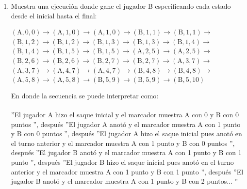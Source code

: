 \begin{exercise}
\begin{enumerate}
\[{\begin{array}{lcl}
                        \inference{(\text{B},\text{X},\text{Y})\ \text{ I} \cup \Gamma ,& (\text{B},\text{X},\text{Y}+1)\ \text{ } \Gamma \cup \text{F}}{(\text{B},\text{X},\text{Y})\rightarrow(\text{B},\text{X},\text{Y}+1)\  \text{ } \Gamma \cup \text{F}}[$(\text{B}+)$] 
                    \end{array}
                }
                \] 
                \bigskip
                \[
                \scalemath{0.81}{
                    \begin{array}{lcl}    
                        \inference{(\text{C},\text{X},\text{Y})\  \Gamma}{(\text{C},\text{X},\text{Y})\rightarrow(\text{C},\text{X},\text{Y})\ \Gamma}[$(saque)$] 
   
                    \end{array}
                }
                \] 
            \item Muestra una ejecución donde gane el jugador B especificando cada estado desde el inicial hasta el final: 
                \begin{center}
                    $ (\text{A},0,0) \rightarrow (\text{A},1,0) \rightarrow (\text{A},1,0) \rightarrow (\text{B},1,1) \rightarrow (\text{B},1,1) \rightarrow$ \\
                    $ (\text{B},1,2) \rightarrow (\text{B},1,2) \rightarrow (\text{B},1,3) \rightarrow (\text{B},1,3) \rightarrow (\text{B},1,4) \rightarrow$ \\
                    $ (\text{B},1,4) \rightarrow (\text{B},1,5) \rightarrow (\text{B},1,5) \rightarrow (\text{A},2,5) \rightarrow (\text{A},2,5) \rightarrow$ \\
                    $ (\text{B},2,6) \rightarrow (\text{B},2,6) \rightarrow (\text{B},2,7) \rightarrow (\text{B},2,7) \rightarrow (\text{A},3,7) \rightarrow$ \\
                    $ (\text{A},3,7) \rightarrow (\text{A},4,7) \rightarrow (\text{A},4,7) \rightarrow (\text{B},4,8) \rightarrow (\text{B},4,8) \rightarrow $\\
                    $ (\text{A},5,8) \rightarrow (\text{A},5,8) \rightarrow (\text{B},5,9) \rightarrow (\text{B},5,9) \rightarrow (\text{B},5,10) $
                \end{center}
                En donde la secuencia se puede interpretar como: \\\\
                 ''El jugador A hizo el saque inicial y el marcador muestra A con 0 y B con 0 puntos '', después  ''El jugador A anotó y el marcador muestra A con 1 punto y B con 0 puntos '', después  ''El jugador A hizo el saque inicial pues anotó en el turno anterior y el marcador muestra A con 1 punto y B con 0 puntos '', después  ''El jugador B anotó y el marcador muestra A con 1  punto y B con 1 punto '', después  ''El jugador B hizo el saque inicial pues anotó en el turno anterior y el marcador muestra A con 1  punto y B con 1 punto '', después  ''El jugador B anotó y el marcador muestra A con 1  punto y B con 2 puntos... ''         
        \end{enumerate}

    \end{exercise}

